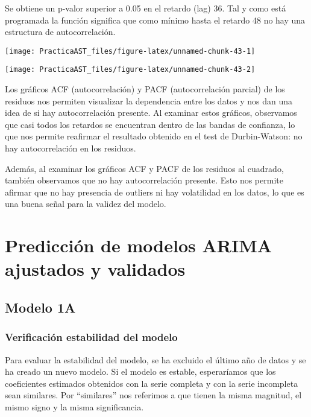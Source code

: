 \documentclass[
]{article}
\begin{document}
Se obtiene un p-valor superior a 0.05 en el retardo (lag) 36. Tal y como
está programada la función significa que como mínimo hasta el retardo 48
no hay una estructura de autocorrelación.

\begin{center}\texttt{[image: PracticaAST\_files/figure-latex/unnamed-chunk-43-1]} \end{center}

\begin{center}\texttt{[image: PracticaAST\_files/figure-latex/unnamed-chunk-43-2]} \end{center}

Los gráficos ACF (autocorrelación) y PACF (autocorrelación parcial) de
los residuos nos permiten visualizar la dependencia entre los datos y
nos dan una idea de si hay autocorrelación presente. Al examinar estos
gráficos, observamos que casi todos los retardos se encuentran dentro de
las bandas de confianza, lo que nos permite reafirmar el resultado
obtenido en el test de Durbin-Watson: no hay autocorrelación en los
residuos.

Además, al examinar los gráficos ACF y PACF de los residuos al cuadrado,
también observamos que no hay autocorrelación presente. Esto nos permite
afirmar que no hay presencia de outliers ni hay volatilidad en los
datos, lo que es una buena señal para la validez del modelo.

\hypertarget{predicciuxf3n-de-modelos-arima-ajustados-y-validados}{%
\section{Predicción de modelos ARIMA ajustados y
validados}\label{predicciuxf3n-de-modelos-arima-ajustados-y-validados}}

\hypertarget{modelo-1a}{%
\subsection{Modelo 1A}\label{modelo-1a}}

\hypertarget{verificaciuxf3n-estabilidad-del-modelo}{%
\subsubsection{Verificación estabilidad del
modelo}\label{verificaciuxf3n-estabilidad-del-modelo}}

Para evaluar la estabilidad del modelo, se ha excluido el último año de
datos y se ha creado un nuevo modelo. Si el modelo es estable,
esperaríamos que los coeficientes estimados obtenidos con la serie
completa y con la serie incompleta sean similares. Por ``similares'' nos
referimos a que tienen la misma magnitud, el mismo signo y la misma
significancia.
\end{document}
